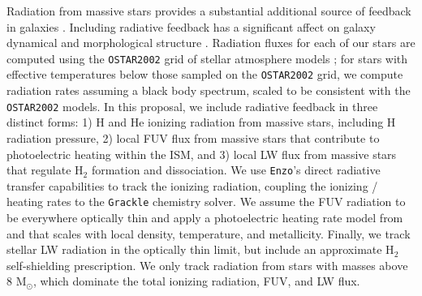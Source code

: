 \documentclass[11pt]{article}
\newcommand{\eg}{e.g.,}
\begin{document}

Radiation from massive stars provides a substantial additional source of feedback in galaxies \citep[\eg][]{Agertz2013}. Including radiative feedback has a significant affect on galaxy dynamical and morphological structure \citep[\eg][]{WiseAbel2012, Kim2013a, Kim2013b, Roskar2014, Rosdahl2015}. Radiation fluxes for each of our stars are computed using the \texttt{OSTAR2002} grid of stellar atmosphere models \citep{Lanz2003}; for stars with effective temperatures below those sampled on the \texttt{OSTAR2002} grid, we compute radiation rates assuming a black body spectrum, scaled to be consistent with the \texttt{OSTAR2002} models. In this proposal, we include radiative feedback in three distinct forms: 1) H and He ionizing radiation from massive stars, including H radiation pressure, 2) local FUV flux from massive stars that contribute to photoelectric heating within the ISM, and 3) local LW flux from massive stars that regulate H$_{2}$ formation and dissociation. 
We use \texttt{Enzo}'s direct radiative transfer capabilities \citep{Wise2012a,WiseAbel2012,Wise2014} to track the ionizing radiation, coupling the ionizing / heating rates to the \texttt{Grackle} chemistry solver. We assume the FUV radiation to be everywhere optically thin and apply a photoelectric heating rate model from \cite{BakesTielens1994} and \cite{Wolfire2003} that scales with local density, temperature, and metallicity. Finally, we track stellar LW radiation in the optically thin limit, but include an approximate H$_{2}$ self-shielding prescription. We only track radiation from stars with masses above 8 M$_{\odot}$, which dominate the total ionizing radiation, FUV, and LW flux.
\end{document}
